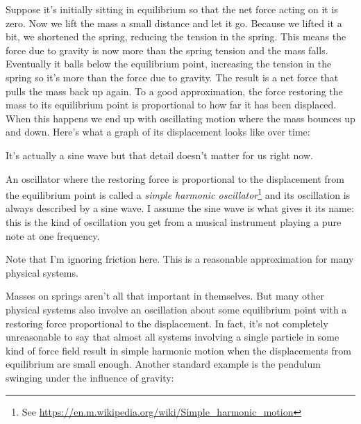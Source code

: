 \documentclass[a4paper]{article}
\begin{document}
Suppose it's initially sitting in equilibrium so that the net force acting on it is zero.
Now we lift the mass a small distance and let it go.
Because we lifted it a bit, we shortened the spring, reducing the tension in the spring.
This means the force due to gravity is now more than the spring tension and the mass falls.
Eventually it balls below the equilibrium point, increasing the tension in the spring so it's more than the force due to gravity.
The result is a net force that pulls the mass back up again.
To a good approximation, the force restoring the mass to its equilibrium point is proportional to how far it has been displaced.
When this happens we end up with oscillating motion where the mass bounces up and down.
Here's what a graph of its displacement looks like over time:

\begin{center}
\end{center}
It's actually a sine wave but that detail doesn't matter for us right now.

An oscillator where the restoring force is proportional to the displacement from the equilibrium point is called a {\em simple harmonic oscillator}\footnote{See \url{https://en.m.wikipedia.org/wiki/Simple_harmonic_motion}} and its oscillation is always described by a sine wave.
I assume the sine wave is what gives it its name: this is the kind of oscillation you get from a musical instrument playing a pure note at one frequency.

Note that I'm ignoring friction here. This is a reasonable approximation for many physical systems.

Masses on springs aren't all that important in themselves. But many other physical systems also involve an oscillation about some equilibrium point with a restoring force proportional to the displacement.
In fact, it's not completely unreasonable to say that almost all systems involving a single particle in some kind of force field result in simple harmonic motion when the displacements from equilibrium are small enough. Another standard example is the pendulum swinging under the influence of gravity:
\end{document}
